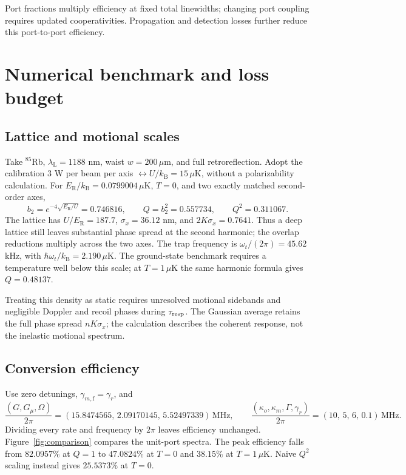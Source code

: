 \documentclass[aps,pra,onecolumn,10pt,letterpaper,notitlepage,nofootinbib,amsmath,amssymb]{revtex4-2}
\newcommand{\kb}{k_{\mathrm B}}
\newcommand{\ER}{E_{\mathrm R}}
\newcommand{\Om}{\Omega}
\newcommand{\gadd}{\gamma_{m,\mathrm{f}}}
\begin{document}
Port fractions multiply efficiency at fixed total linewidths; changing port
coupling requires updated cooperativities. Propagation and detection losses further
reduce this port-to-port efficiency.

\section{Numerical benchmark and loss budget}
\label{sec:example}
\subsection{Lattice and motional scales}
Take $^{85}$Rb, $\lambda_{\mathrm L}=1188$ nm, waist $w=200\,\mu$m, and full
retroreflection. Adopt the calibration $3$ W per beam per axis
$\leftrightarrow U/\kb=15\,\mu$K, without a polarizability calculation.
For $\ER/\kb=0.0799004\,\mu$K, $T=0$, and two exactly matched second-order axes,
\begin{equation}
 b_2=e^{-4\sqrt{\ER/U}}=0.746816,\qquad
 Q=b_2^2=0.557734,\qquad Q^2=0.311067.
 \label{eq:qnumber}
\end{equation}
The lattice has $U/\ER=187.7$, $\sigma_x=36.12$ nm, and $2K\sigma_x=0.7641$.
Thus a deep lattice still leaves substantial phase spread at the second harmonic;
the overlap reductions multiply across the two axes. The trap frequency is
$\omega_t/(2\pi)=45.62$ kHz, with $\hbar\omega_t/\kb=2.190\,\mu$K.
The ground-state benchmark requires a temperature well below this scale;
at $T=1\,\mu$K the same harmonic formula gives $Q=0.48137$.

Treating this density as static requires unresolved motional sidebands and
negligible Doppler and recoil phases during $\tau_{\rm resp}$. The Gaussian average
retains the full phase spread $nK\sigma_x$; the calculation describes the coherent
response, not the inelastic motional spectrum.

\subsection{Conversion efficiency}
Use zero detunings, $\gadd=\gamma_r$, and
\begin{equation}
 \frac{(G,G_\mu,\Om)}{2\pi}=(15.8474565,\,2.09170145,\,5.52497339)\,\mathrm{MHz},
 \qquad
 \frac{(\kappa_o,\kappa_m,\Gamma,\gamma_r)}{2\pi}=(10,\,5,\,6,\,0.1)\,\mathrm{MHz}.
 \label{eq:benchmark}
\end{equation}
Dividing every rate and frequency by $2\pi$ leaves efficiency unchanged.
Figure~\ref{fig:comparison} compares the unit-port spectra. The peak efficiency
falls from $82.0957\%$ at $Q=1$ to $47.0824\%$ at $T=0$ and $38.15\%$ at
$T=1\,\mu$K. Naive $Q^2$ scaling instead gives $25.5373\%$ at $T=0$.
\end{document}

